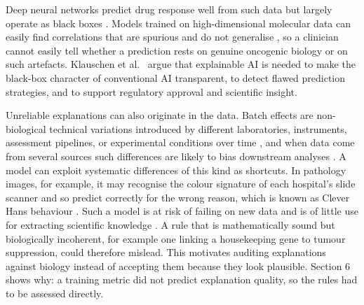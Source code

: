 Deep neural networks predict drug response well from such data but largely operate as black boxes \citep{partin2023,klauschen2024}. Models trained on high-dimensional molecular data can easily find correlations that are spurious and do not generalise \citep{klauschen2024}, so a clinician cannot easily tell whether a prediction rests on genuine oncogenic biology or on such artefacts. Klauschen et al.\ \citeyearpar{klauschen2024} argue that explainable AI is needed to make the black-box character of conventional AI transparent, to detect flawed prediction strategies, and to support regulatory approval and scientific insight.

Unreliable explanations can also originate in the data. Batch effects are non-biological technical variations introduced by different laboratories, instruments, assessment pipelines, or experimental conditions over time \citep{yu2024,goh2022}, and when data come from several sources such differences are likely to bias downstream analyses \citep{partin2023}. A model can exploit systematic differences of this kind as shortcuts. In pathology images, for example, it may recognise the colour signature of each hospital’s slide scanner and so predict correctly for the wrong reason, which is known as Clever Hans behaviour \citep{klauschen2024}. Such a model is at risk of failing on new data and is of little use for extracting scientific knowledge \citep{klauschen2024}. A rule that is mathematically sound but biologically incoherent, for example one linking a housekeeping gene to tumour suppression, could therefore mislead. This motivates auditing explanations against biology instead of accepting them because they look plausible. Section 6 shows why: a training metric did not predict explanation quality, so the rules had to be assessed directly.